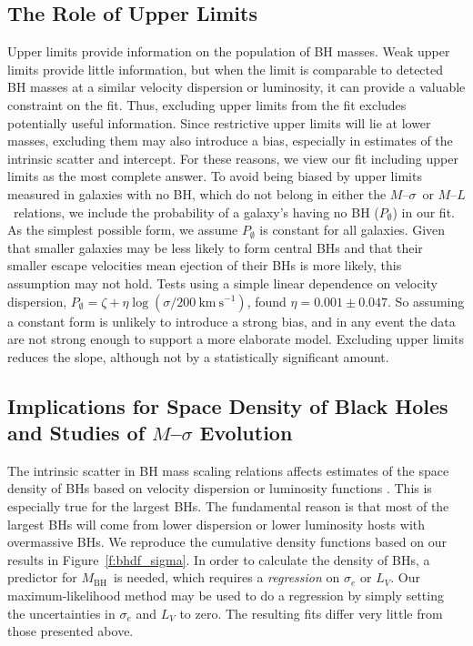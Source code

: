\documentclass[twosided,letterpaper,numberedappendix]{emulateapj}
\newcommand{\kms}      {\ensuremath{~\mathrm{km~s^{-1}}}}
\newcommand{\msigma}   {\ensuremath{M}{--}\ensuremath{\sigma}}
\newcommand{\ml}       {\ensuremath{M}{--}\ensuremath{L}}
\newcommand{\mbh}      {\ensuremath{M_{\mathrm{BH}}}}
\begin{document}
\subsection{The Role of Upper Limits}
\label{upperlimits}
Upper limits provide information on the population of BH masses.  Weak
upper limits provide little information, but when the limit is
comparable to detected BH masses at a similar velocity dispersion or
luminosity, it can provide a valuable constraint on the fit.  Thus,
excluding upper limits from the fit excludes potentially useful
information.  Since restrictive upper limits will lie at lower masses,
excluding them may also introduce a bias, especially in estimates of
the intrinsic scatter and intercept.  For these reasons, we view our
fit including upper limits as the most complete answer.  To avoid
being biased by upper limits measured in galaxies with no BH, which do
not belong in either the \msigma\ or \ml\ relations, we include the
probability of a galaxy's having no BH ($P_\emptyset$) in our fit.  As
the simplest possible form, we assume $P_\emptyset$ is constant for
all galaxies.  Given that smaller galaxies may be less likely to form
central BHs and that their smaller escape velocities mean ejection of
their BHs is more likely, this assumption may not hold.  Tests using a
simple linear dependence on velocity dispersion, $P_\emptyset = \zeta
+ \eta \log{(\sigma / 200 \kms)}$, found $\eta = 0.001 \pm
0.047$.  So assuming a constant form is unlikely to introduce a
strong bias, and in any event the data are not strong enough to
support a more elaborate model.
%
Excluding upper limits reduces the slope, although not by a
statistically significant amount.
%



\subsection{Implications for Space Density of Black Holes and Studies 
of \texorpdfstring{\msigma}{M-sigma} Evolution}
\label{bhdf}
The intrinsic scatter in BH mass scaling relations affects estimates
of the space density of BHs based on velocity dispersion or luminosity
functions \citep{yt02,marconietal04,laueretal07}.  This is especially
true for the largest BHs.  The fundamental reason is that most of the
largest BHs will come from lower dispersion or lower luminosity hosts
with overmassive BHs.  We reproduce the cumulative density functions
based on our results in Figure~\ref{f:bhdf_sigma}.  In order to
calculate the density of BHs, a predictor for \mbh\ is needed, which
requires a \emph{regression} on $\sigma_e$ or $L_V$.  Our
maximum-likelihood method may be used to do a regression by simply
setting the uncertainties in $\sigma_e$ and $L_V$ to zero.  The
resulting fits differ very little from those presented above.
\end{document}
